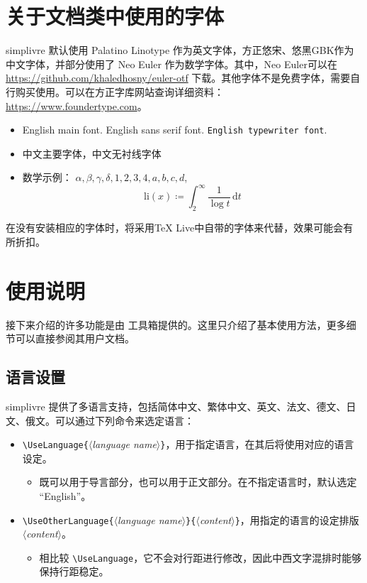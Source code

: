 \documentclass{simplivre}
\providecommand{\meta}[1]{$\langle${\normalfont\itshape#1}$\rangle$}
\newenvironment{remind}[1][提示]{%
    \LocallyStopLineNumbers%
    \begin{tcolorbox}[breakable,
        enhanced,
        width = \textwidth,
        colback = white, colbacktitle = paper,
        colframe = gray!50, boxrule=0.2mm,
        coltitle = black,
        fonttitle = \sffamily,
        attach boxed title to top left = {yshift=-\tcboxedtitleheight/2,  xshift=\tcboxedtitlewidth/4},
        boxed title style = {boxrule=0pt, colframe=paper},
        before skip = 0.3cm,
        after skip = 0.3cm,
        top = 3mm,
        bottom = 3mm,
        title={\sffamily #1}]%
}{\end{tcolorbox}\ResumeLineNumbers}
\providecommand{\simplivre}{\textsf{simplivre}}
\begin{document}
\chapter{关于文档类中使用的字体}
\simplivre{} 默认使用 Palatino Linotype 作为英文字体，方正悠宋、悠黑GBK作为中文字体，并部分使用了 Neo Euler 作为数学字体。其中，Neo Euler可以在 \url{https://github.com/khaledhosny/euler-otf} 下载。其他字体不是免费字体，需要自行购买使用。可以在方正字库网站查询详细资料：\url{https://www.foundertype.com}。

\begin{remind}[字体演示]
    \begin{itemize}
        \item English main font. \textsf{English sans serif font}. \texttt{English typewriter font}.
        \item 中文主要字体，\textsf{中文无衬线字体}
        \item 数学示例： \( \alpha, \beta, \gamma, \delta, 1,2,3,4, a,b,c,d \), \[\mathrm{li}(x)\coloneqq \int_2^{\infty} \frac{1}{\log t}\,\mathrm{d}t \]
    \end{itemize}
\end{remind}

\bigskip
在没有安装相应的字体时，将采用TeX Live中自带的字体来代替，效果可能会有所折扣。


\chapter{使用说明}

接下来介绍的许多功能是由 \ProjLib{} 工具箱提供的。这里只介绍了基本使用方法，更多细节可以直接参阅其用户文档。

\section{语言设置}

\simplivre{} 提供了多语言支持，包括简体中文、繁体中文、英文、法文、德文、日文、俄文。可以通过下列命令来选定语言：
\begin{itemize}
    \item \lstinline|\UseLanguage{|\meta{language name}\lstinline|}|，用于指定语言，在其后将使用对应的语言设定。
    \begin{itemize}
        \item 既可以用于导言部分，也可以用于正文部分。在不指定语言时，默认选定 “English”。
    \end{itemize}
    \item \lstinline|\UseOtherLanguage{|\meta{language name}\lstinline|}{|\meta{content}\lstinline|}|，用指定的语言的设定排版 \meta{content}。
    \begin{itemize}
        \item 相比较 \lstinline|\UseLanguage|，它不会对行距进行修改，因此中西文字混排时能够保持行距稳定。
    \end{itemize}
\end{itemize}
\end{document}
